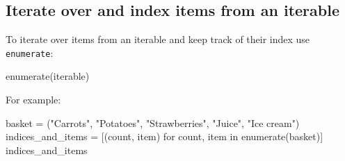 \subsection{Iterate over and index items from an iterable}
\label{\detokenize{building-tools/01-variables-conditionals-loops/how/main:iterate-over-and-index-items-from-an-iterable}}

To iterate over items from an iterable and keep track of their index use
\texttt{enumerate}:


\begin{pyin}
enumerate(iterable)
\end{pyin}



For example:




\begin{pyin}
basket = ("Carrots", "Potatoes", "Strawberries", "Juice", "Ice cream")
indices_and_items = [(count, item) for count, item in enumerate(basket)]
indices_and_items
\end{pyin}





\begin{raw}
\end{raw}







